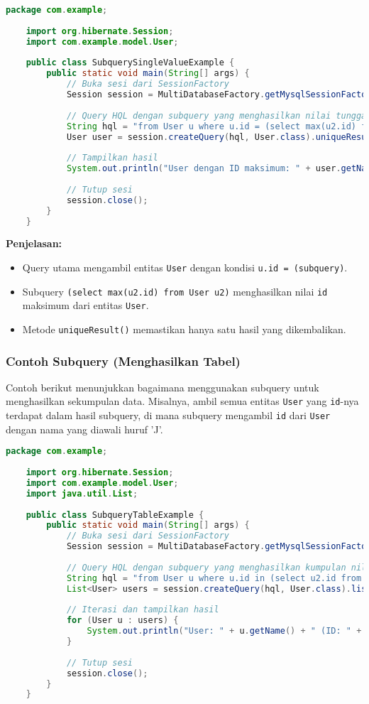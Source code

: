 \begin{lstlisting}[language=Java, style=JavaStyle]
	package com.example;
	
	import org.hibernate.Session;
	import com.example.model.User;
	
	public class SubquerySingleValueExample {
		public static void main(String[] args) {
			// Buka sesi dari SessionFactory
			Session session = MultiDatabaseFactory.getMysqlSessionFactory().openSession();
			
			// Query HQL dengan subquery yang menghasilkan nilai tunggal (max id)
			String hql = "from User u where u.id = (select max(u2.id) from User u2)";
			User user = session.createQuery(hql, User.class).uniqueResult();
			
			// Tampilkan hasil
			System.out.println("User dengan ID maksimum: " + user.getName() + " (ID: " + user.getId() + ")");
			
			// Tutup sesi
			session.close();
		}
	}
\end{lstlisting}

\textbf{Penjelasan:}
\begin{itemize}
	\item Query utama mengambil entitas \texttt{User} dengan kondisi \texttt{u.id = (subquery)}.
	\item Subquery \texttt{(select max(u2.id) from User u2)} menghasilkan nilai \texttt{id} maksimum dari entitas \texttt{User}.
	\item Metode \texttt{uniqueResult()} memastikan hanya satu hasil yang dikembalikan.
\end{itemize}

\subsubsection*{Contoh Subquery (Menghasilkan Tabel)}
Contoh berikut menunjukkan bagaimana menggunakan subquery untuk menghasilkan sekumpulan data. Misalnya, ambil semua entitas \texttt{User} yang \texttt{id}-nya terdapat dalam hasil subquery, di mana subquery mengambil \texttt{id} dari \texttt{User} dengan nama yang diawali huruf 'J'.

\begin{lstlisting}[language=Java, style=JavaStyle]
	package com.example;
	
	import org.hibernate.Session;
	import com.example.model.User;
	import java.util.List;
	
	public class SubqueryTableExample {
		public static void main(String[] args) {
			// Buka sesi dari SessionFactory
			Session session = MultiDatabaseFactory.getMysqlSessionFactory().openSession();
			
			// Query HQL dengan subquery yang menghasilkan kumpulan nilai (tabel)
			String hql = "from User u where u.id in (select u2.id from User u2 where u2.name like 'J%')";
			List<User> users = session.createQuery(hql, User.class).list();
			
			// Iterasi dan tampilkan hasil
			for (User u : users) {
				System.out.println("User: " + u.getName() + " (ID: " + u.getId() + ")");
			}
			
			// Tutup sesi
			session.close();
		}
	}
\end{lstlisting}

